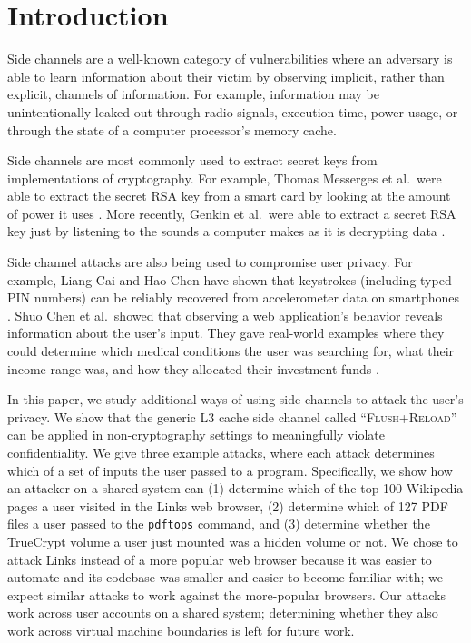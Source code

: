 \documentclass[letterpaper,twocolumn,10pt]{article}
\begin{document}
\section{Introduction}
\label{sec:intro}

Side channels are a well-known category of vulnerabilities where an adversary is
able to learn information about their victim by observing implicit, rather than
explicit, channels of information. For example, information may be
unintentionally leaked out through radio signals, execution time, power usage,
or through the state of a computer processor's memory cache.

Side channels are most commonly used to extract secret keys from implementations
of cryptography. For example, Thomas Messerges et al.\ were able to extract the
secret RSA key from a smart card by looking at the amount of power it uses
\cite{messerges1999power}. More recently, Genkin et al.\ were able to extract
a secret RSA key just by listening to the sounds a computer makes as it is
decrypting data \cite{genkin2013rsa}. 

Side channel attacks are also being used to compromise user privacy. For
example, Liang Cai and Hao Chen have shown that keystrokes (including typed PIN
numbers) can be reliably recovered from accelerometer data on smartphones
\cite{cai2012practicality}. Shuo Chen et al.\ showed that observing a web
application's behavior reveals information about the user's input. They gave
real-world examples where they could determine which medical conditions the user
was searching for, what their income range was, and how they allocated their
investment funds \cite{chen2010side}.

In this paper, we study additional ways of using side channels to attack the
user's privacy. We show that the generic L3 cache side channel called
``\textsc{Flush+Reload}'' \cite{yarom2013flush} can be applied in
non-cryptography settings to meaningfully violate confidentiality. We give three
example attacks, where each attack determines which of a set of inputs the user
passed to a program. Specifically, we show how an attacker on a shared system
can (1) determine which of the top 100 Wikipedia pages a user visited in the
Links web browser, (2) determine which of 127 PDF files a user passed to the
\texttt{pdftops} command, and (3) determine whether the TrueCrypt volume a user
just mounted was a hidden volume or not. We chose to attack Links instead of
a more popular web browser because it was easier to automate and its codebase
was smaller and easier to become familiar with; we expect similar attacks to
work against the more-popular browsers. Our attacks work across user accounts on
a shared system; determining whether they also work across virtual machine
boundaries is left for future work.
\end{document}
